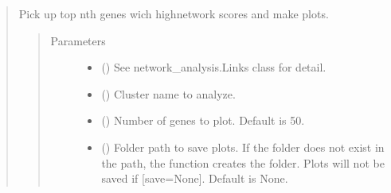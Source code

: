 \documentclass[letterpaper,10pt,english]{sphinxmanual}
\begin{document}
\begin{quote}
\begin{fulllineitems}
\begin{fulllineitems}
\begin{quote}
\begin{description}
\begin{itemize}
\end{itemize}

\end{description}\end{quote}

\end{fulllineitems}


\begin{fulllineitems}
\label{\detokenize{modules/celloracle.network_analysis:celloracle.network_analysis.Links.plot_scores_as_rank}}
Pick up top n\sphinxhyphen{}th genes wich high\sphinxhyphen{}network scores and make plots.
\begin{quote}\begin{description}
\item[{Parameters}] \leavevmode\begin{itemize}
\item {} 
 ({\hyperref[\detokenize{modules/celloracle:celloracle.Links}]{}}) \textendash{} See network\_analysis.Links class for detail.

\item {} 
 () \textendash{} Cluster name to analyze.

\item {} 
 () \textendash{} Number of genes to plot. Default is 50.

\item {} 
 () \textendash{} Folder path to save plots. If the folder does not exist in the path, the function creates the folder.
Plots will not be saved if {[}save=None{]}. Default is None.

\end{itemize}

\end{description}\end{quote}


\end{fulllineitems}
\end{fulllineitems}
\end{quote}
\end{document}
